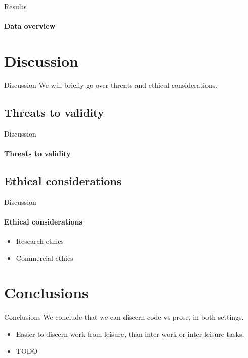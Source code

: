 \documentclass[xcolor={dvipsnames,table},12pt]{beamer}
\newif\ifplacelogo{}  %
\begin{document}
\placelogofalse{}
\begin{frame}{Results}
    \framesubtitle{Data overview}
    {
        \tiny
        
    }
\end{frame}
\placelogotrue{}

\section{Discussion}
\begin{frame}{Discussion}
    We will briefly go over threats and ethical considerations.
\end{frame}


\subsection*{Threats to validity}
\begin{frame}{Discussion}
    \framesubtitle{Threats to validity}
\end{frame}

\subsection*{Ethical considerations}
\begin{frame}{Discussion}
    \framesubtitle{Ethical considerations}

    \begin{itemize}
        \item Research ethics
        \item Commercial ethics
    \end{itemize}
\end{frame}

\section{Conclusions}
\begin{frame}{Conclusions}
    We conclude that we can discern code vs prose, in both settings.

    \begin{itemize}
        \item Easier to discern work from leisure, than inter-work or inter-leisure tasks.
        \item TODO
    \end{itemize}
\end{frame}
\end{document}
